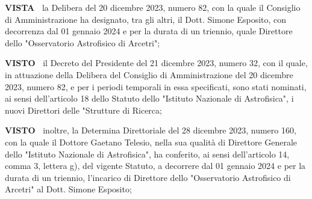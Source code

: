 \textbf{VISTA~}	la Delibera del 20 dicembre 2023, numero 82, con la
quale il Consiglio di Amministrazione ha designato, tra gli altri,
il Dott. Simone Esposito, con decorrenza dal 01 gennaio 2024 e per la
durata di un triennio, quale Direttore dello "Osservatorio Astrofisico
di Arcetri";

\textbf{VISTO~}	il Decreto del Presidente del 21 dicembre 2023,
numero 32, con il quale, in attuazione della Delibera del Consiglio di
Amministrazione del 20 dicembre 2023, numero 82, e per i periodi temporali
in essa specificati, sono stati nominati, ai sensi dell’articolo
18 dello Statuto dello "Istituto Nazionale di Astrofisica", i nuovi
Direttori delle "Strutture di Ricerca;

\textbf{VISTO~}	inoltre, la Determina Direttoriale del 28 dicembre 2023,
numero 160, con la quale il Dottore Gaetano Telesio, nella sua qualità
di Direttore Generale dello "Istituto Nazionale di Astrofisica", ha
conferito, ai sensi dell’articolo 14, comma 3, lettera g), del vigente
Statuto, a decorrere dal 01 gennaio 2024 e per la durata di un triennio,
l'incarico di Direttore dello "Osservatorio Astrofisico di Arcetri"
al Dott. Simone Esposito;

